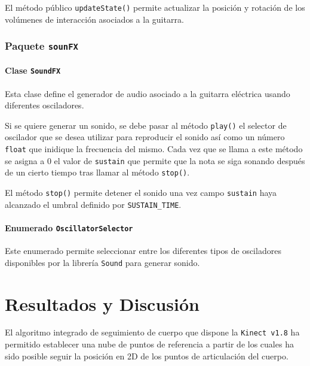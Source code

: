 \documentclass[10pt,a4paper]{report}
\begin{document}
	El método público \texttt{updateState()} permite actualizar la posición y rotación de los volúmenes de interacción asociados a la guitarra.
	
	
	
	\subsection{Paquete \texttt{sounFX}}
	\subsubsection{Clase \texttt{SoundFX}}
	Esta clase define el generador de audio asociado a la guitarra eléctrica usando diferentes osciladores.
	
	Si se quiere generar un sonido, se debe pasar al método \texttt{play()} el selector de oscilador que se desea utilizar para reproducir el sonido así como un número \texttt{float} que inidique la frecuencia del mismo. Cada vez que se llama a este método se asigna a 0 el valor de \texttt{sustain} que permite que la nota se siga sonando después de un cierto tiempo tras llamar al método \texttt{stop()}.
	
	
	
	El método \texttt{stop()} permite detener el sonido una vez campo \texttt{sustain} haya alcanzado el umbral definido por \texttt{SUSTAIN\_TIME}.
	
	
	
	\subsubsection{Enumerado \texttt{OscillatorSelector}}
	Este enumerado permite seleccionar entre los diferentes tipos de osciladores disponibles por la librería \texttt{Sound} para generar sonido.
	
	
	
	\chapter{Resultados y Discusión}
	El algoritmo integrado de seguimiento de cuerpo que dispone la \texttt{Kinect v1.8} ha permitido establecer una nube de puntos de referencia a partir de los cuales ha sido posible seguir la posición en 2D de los puntos de articulación del cuerpo. 
	
\end{document}
